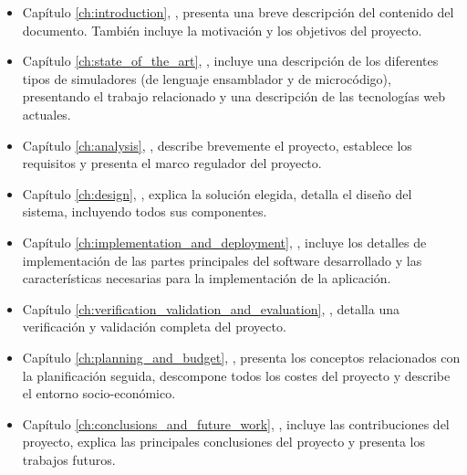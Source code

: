 \begin{itemize}

\item Capítulo \ref{ch:introduction}, \textit{}, presenta una breve descripción del contenido del documento. También incluye la motivación y los objetivos del proyecto.

\item Capítulo \ref{ch:state_of_the_art}, \textit{}, incluye una descripción de los diferentes tipos de simuladores (de lenguaje ensamblador y de microcódigo), presentando el trabajo relacionado y una descripción de las tecnologías web actuales.

\item Capítulo \ref{ch:analysis}, \textit{}, describe brevemente el proyecto, establece los requisitos y presenta el marco regulador del proyecto.

\item Capítulo \ref{ch:design}, \textit{}, explica la solución elegida, detalla el diseño del sistema, incluyendo todos sus componentes.

\item Capítulo \ref{ch:implementation_and_deployment}, \textit{}, incluye los detalles de implementación de las partes principales del software desarrollado y las características necesarias para la implementación de la aplicación.

\item Capítulo \ref{ch:verification_validation_and_evaluation}, \textit{}, detalla una verificación y validación completa del proyecto.

\item Capítulo \ref{ch:planning_and_budget}, \textit{}, presenta los conceptos relacionados con la planificación seguida, descompone todos los costes del proyecto y describe el entorno socio-económico.

\item Capítulo \ref{ch:conclusions_and_future_work}, \textit{}, incluye las contribuciones del proyecto, explica las principales conclusiones del proyecto y presenta los trabajos futuros.

\end{itemize}

